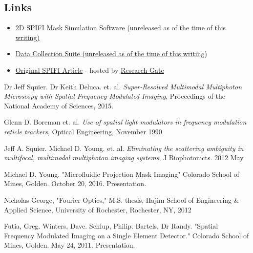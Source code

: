 \documentclass[12pt]{article}
\begin{document}
\subsection{Links}
\begin{itemize}
\item \href{https://gitlab.com/PiercingGaze/2DSimulator}{2D SPIFI Mask Simulation Software (unreleased as of the time of this writing)}
\item \href{https://gitlab.com/PiercingGaze/SPIFIDataCollectionSoftware}{Data Collection Suite (unreleased as of the time of this writing)}
\item \href{https://www.researchgate.net/profile/Alyssa_Allende_Motz/publication/281058706_Super-resolved_multimodal_multiphoton_microscopy_with_spatial_frequency-modulated_imaging/links/5790535d08ae64311c0c7dbb.pdf?origin=publication_detail&ev=pub_int_prw_xdl&msrp=c3fj9RD45iTpvk8bRBlzYkN6ndcAYlW9SDWsP0gVb8WzFV5pplCJ3WT6D9fQrP2OT3rGfRWxpWECBz07rTxtH3ZWQ-V2CIIn99KlfPF-otY.9HgCklW2b18-KeSg_Y6vX11zOug1uQ3SSCEpbGXSzk5y_fIuZAdBHJtjk82L1NpfpV2e2Cvcd6QBkqBT24bFzQ.uEqPWNYXdN8Ge_jgkDmRdTlNB8rMwiFPPFdueuZQ9VY6c_KOsp-YvgMVBaNkL6Ldag5ifDVuL2YqcNGnICTcHA}{Original SPIFI Article} - hosted by
\href{https://www.researchgate.net}{Research Gate}
\end{itemize}
\newpage
\begin{thebibliography}{9}

  Dr Jeff Squier. Dr Keith Deluca. et. al.
  \emph{Super-Resolved Multimodal Multiphoton Microscopy with Spatial Frequency-Modulated
Imaging},
  Proceedings of the National Academy of Sciences,
  2015.

	Glenn D. Boreman et. al.
	\emph{Use of spatial light modulators in frequency modulation reticle trackers},
	Optical Engineering, November 1990

	Jeff A. Squier. Michael D. Young. et. al.
	\emph{Eliminating the scattering ambiguity in multifocal, multimodal multiphoton imaging systems},
	J Biophotonicts. 2012 May

	Michael D. Young.
	"Microfluidic Projection Mask Imaging"
	Colorado School of Mines, Golden. October 20, 2016. Presentation.

	Nicholas George,
	"Fourier Optics," M.S. thesis, Hajim School of Engineering \& Applied Science, University of Rochester, Rochester, NY, 2012

  
  Futia, Greg. Winters, Dave. Schlup, Philip. Bartels, Dr Randy.
  "Spatial Frequency Modulated Imaging on a Single Element Detector."
  Colorado School of Mines, Golden. May 24, 2011. Presentation.
  

\end{thebibliography}
\end{document}
